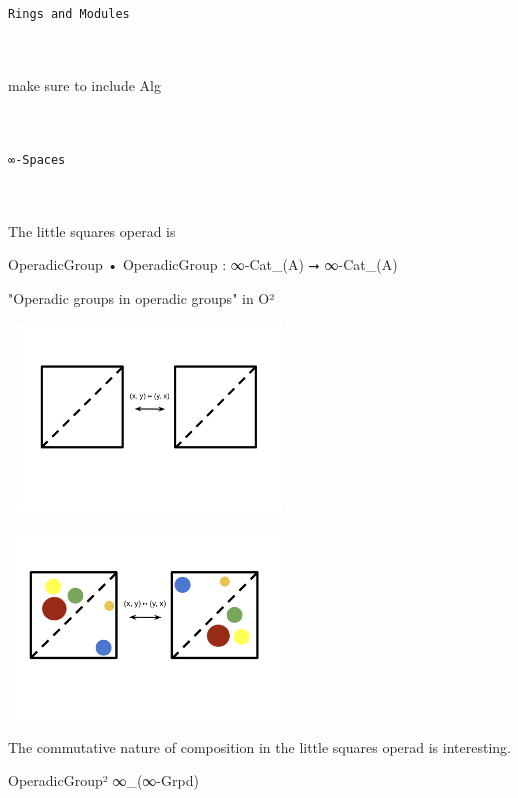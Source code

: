 \documentclass{book}
\theoremstyle{definition}
\renewcommand{\chapter}[1]{
\newpage
{
\Huge 
\begin{center}
\ \\
\ \\
\thispagestyle{empty}
\texttt{#1}
\end{center}}
\ \\
\ \\
}
\begin{document}
\chapter{Rings and Modules}

make sure to include Alg




\chapter{∞-Spaces}

The little squares operad is 

\begin{center}
OperadicGroup • OperadicGroup  : ∞-Cat\_(A) ⭢ ∞-Cat\_(A) 
\end{center}

"Operadic groups in operadic groups" in O²

\begin{center}
\includegraphics[width=7.5cm,height=5cm]{littlesquaresA.png}
\end{center}

\begin{center}
\includegraphics[width=7.5cm,height=5cm]{littlesquaresB.png}
\end{center}

The commutative nature of composition in the little squares operad is interesting.

\begin{center}
OperadicGroup² ∞\_(∞-Grpd)
\end{center}
\end{document}
